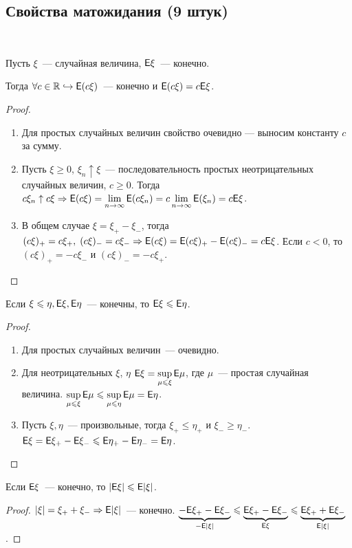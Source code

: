 \subsection{Свойства матожидания (9 штук)}
\begin{property}~

	Пусть $\xi$~--- случайная величина, $\mathsf{E} \xi$~--- конечно. 
	
	Тогда $\forall c \in \mathbb{R} \hookrightarrow \mathsf{E}(c\xi)$~--- конечно и $\mathsf{E}(c\xi) = c\mathsf{E}\xi$.
	\begin{proof}
	    \begin{enumerate}
    	    \item Для простых случайных величин свойство очевидно --- выносим константу $c$ за сумму. 
    		
    		\item Пусть $\xi \geqslant 0$, $\xi_n \uparrow \xi$~--- последовательность простых неотрицательных случайных величин, $c \geqslant 0$. Тогда $c\xi_n \uparrow c\xi \Rightarrow \mathsf{E}(c\xi) = \lim\limits_{n \rightarrow \infty} \mathsf{E}(c\xi_n) = c \lim\limits_{n \rightarrow \infty} \mathsf{E}(\xi_n) = c\mathsf{E}\xi$. 
    		
    		\item В общем случае $\xi = \xi_+ - \xi_-$, тогда $(c\xi)_+ = c\xi_+,\; (c\xi)_- = c\xi_- \Rightarrow \mathsf{E}(c\xi) = \mathsf{E}(c\xi)_+ - \mathsf{E}(c\xi)_- = c\mathsf{E}\xi$. Если $c < 0$, то $(c\xi)_+ = -c\xi_-$ и $(c\xi)_- = -c\xi_+$.
	    \end{enumerate}
	\end{proof}
\end{property}

\begin{property}
	Если $\xi \leqslant \eta, \mathsf{E} \xi, \mathsf{E} \eta$~--- конечны, то $\mathsf{E} \xi \leqslant \mathsf{E} \eta$.
	\begin{proof}
	    \begin{enumerate}
    	    \item Для простых случайных величин~--- очевидно.
    	    
    	    \item Для неотрицательных $\xi$, $\eta$ $\mathsf{E}\xi = \sup\limits_{\mu \leqslant \xi}\mathsf{E}\mu$, где $\mu$~--- простая случайная величина. $\sup\limits_{\mu \leqslant \xi}\mathsf{E}\mu \leqslant \sup\limits_{\mu \leqslant \eta}\mathsf{E}\mu = \mathsf{E}\eta$. 
    	    
    	    \item Пусть $\xi, \eta$~--- произвольные, тогда $\xi_+ \leqslant \eta_+$ и $\xi_- \geqslant \eta_-$. $\mathsf{E}\xi = \mathsf{E}\xi_+ - \mathsf{E}\xi_- \leqslant \mathsf{E}\eta_+ - \mathsf{E}\eta_- = \mathsf{E}\eta$.
	    \end{enumerate}
	\end{proof}
\end{property}
\begin{property}
	Если $\mathsf{E}\xi$~--- конечно, то $|\mathsf{E}\xi| \leqslant \mathsf{E}|\xi|$.
	\begin{proof}
		$|\xi| = \xi_+ + \xi_- \Rightarrow \mathsf{E}|\xi|$~--- конечно. $\underbrace{-\mathsf{E}\xi_+ - \mathsf{E}\xi_-}_{-\mathsf{E}|\xi|} \leqslant \underbrace{\mathsf{E}\xi_+ - \mathsf{E}\xi_-}_{\mathsf{E}\xi} \leqslant \underbrace{\mathsf{E}\xi_+ + \mathsf{E}\xi_-}_{\mathsf{E}|\xi|}$.
	\end{proof}
\end{property}

